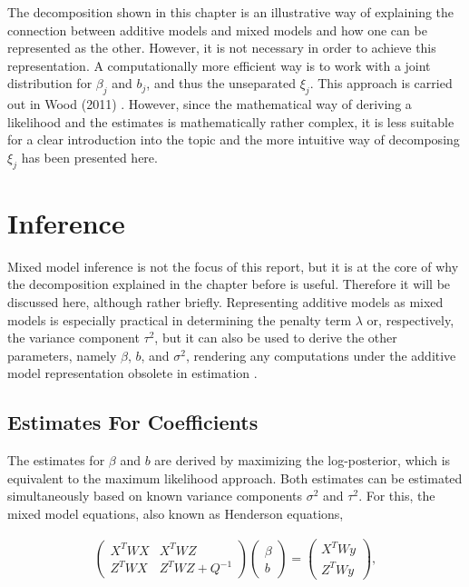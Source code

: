\documentclass[12pt]{article}
\begin{document}
The decomposition shown in this chapter is an illustrative way of explaining the connection between additive models and mixed models and how one can be represented as the other. However, it is not necessary in order to achieve this representation. A computationally more efficient way is to work with a joint distribution for $\beta_j$ and $b_j$, and thus the unseparated $\xi_j$. This approach is carried out in Wood (2011) \cite{wood2011fast}. However, since the mathematical way of deriving a likelihood and the estimates is mathematically rather complex, it is less suitable for a clear introduction into the topic and the more intuitive way of decomposing $\xi_j$ has been presented here.







\section{Inference} %

Mixed model inference is not the focus of this report, but it is at the core of why the decomposition explained in the chapter before is useful. Therefore it will be discussed here, although rather briefly. Representing additive models as mixed models is especially practical in determining the penalty term $\lambda$ or, respectively, the variance component $\tau^2$, but it can also be used to derive the other parameters, namely $\beta$, $b$, and $\sigma^2$, rendering any computations under the additive model representation obsolete in estimation \cite{fahrmeir2013regression, kneib2006mixed}. 

\subsection{Estimates For Coefficients}

The estimates for $\beta$ and $b$ are derived by maximizing the log-posterior, which is equivalent to the maximum likelihood approach. Both estimates can be estimated simultaneously based on known variance components $\sigma^2$ and $\tau^2$. For this, the mixed model equations, also known as Henderson equations, 

\begin{align}
\begin{pmatrix}
X^TWX & X^TWZ \\
Z^TWX & Z^TWZ + Q^{-1}
\end{pmatrix}
\begin{pmatrix}
\beta\\
b
\end{pmatrix} =
\begin{pmatrix}
X^TWy \\
Z^TWy
\end{pmatrix},\label{henderson}
\end{align}
\end{document}

